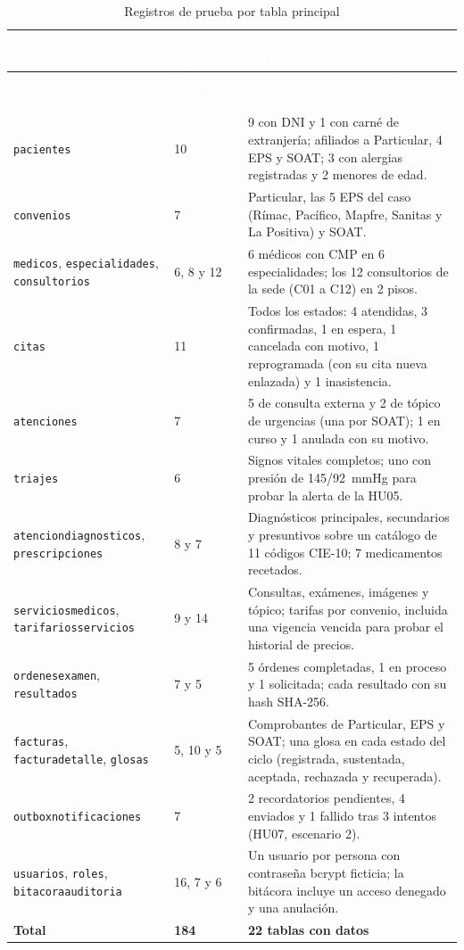 \documentclass[11pt,a4paper]{article}
\newcommand{\cab}[1]{\textcolor{white}{\textbf{#1}}}
\newcommand{\tb}[1]{{\renewcommand{\_}{\textunderscore\allowbreak}\texttt{#1}}}
\begin{document}
\begin{xltabular}{\linewidth}{|P{4.5cm}|P{2.6cm}|L|}
  \caption{Registros de prueba por tabla principal}\label{tab:datos-prueba}\\
  \hline
  \cab{Tabla principal} & \cab{N.° de registros} & \cab{Descripción de los datos ficticios} \\ \hline
  \endfirsthead
  \hline
  \cab{Tabla principal} & \cab{N.° de registros} & \cab{Descripción de los datos ficticios} \\ \hline
  \endhead
  \tb{pacientes} & 10 &
    9 con DNI y 1 con carné de extranjería; afiliados a Particular, 4 EPS y SOAT; 3 con alergias
    registradas y 2 menores de edad. \\ \hline
  \tb{convenios} & 7 &
    Particular, las 5 EPS del caso (Rímac, Pacífico, Mapfre, Sanitas y La Positiva) y SOAT. \\ \hline
  \tb{medicos}, \tb{especialidades}, \tb{consultorios} & 6, 8 y 12 &
    6 médicos con CMP en 6 especialidades; los 12 consultorios de la sede (C01 a C12) en 2 pisos. \\ \hline
  \tb{citas} & 11 &
    Todos los estados: 4 atendidas, 3 confirmadas, 1 en espera, 1 cancelada con motivo,
    1 reprogramada (con su cita nueva enlazada) y 1 inasistencia. \\ \hline
  \tb{atenciones} & 7 &
    5 de consulta externa y 2 de tópico de urgencias (una por SOAT); 1 en curso y 1 anulada
    con su motivo. \\ \hline
  \tb{triajes} & 6 &
    Signos vitales completos; uno con presión de 145/92~mmHg para probar la alerta de la HU05. \\ \hline
  \tb{atencion\_diagnosticos}, \tb{prescripciones} & 8 y 7 &
    Diagnósticos principales, secundarios y presuntivos sobre un catálogo de 11 códigos CIE-10;
    7 medicamentos recetados. \\ \hline
  \tb{servicios\_medicos}, \tb{tarifarios\_servicios} & 9 y 14 &
    Consultas, exámenes, imágenes y tópico; tarifas por convenio, incluida una vigencia
    vencida para probar el historial de precios. \\ \hline
  \tb{ordenes\_examen}, \tb{resultados} & 7 y 5 &
    5 órdenes completadas, 1 en proceso y 1 solicitada; cada resultado con su hash SHA-256. \\ \hline
  \tb{facturas}, \tb{factura\_detalle}, \tb{glosas} & 5, 10 y 5 &
    Comprobantes de Particular, EPS y SOAT; una glosa en cada estado del ciclo (registrada,
    sustentada, aceptada, rechazada y recuperada). \\ \hline
  \tb{outbox\_notificaciones} & 7 &
    2 recordatorios pendientes, 4 enviados y 1 fallido tras 3 intentos (HU07, escenario 2). \\ \hline
  \tb{usuarios}, \tb{roles}, \tb{bitacora\_auditoria} & 16, 7 y 6 &
    Un usuario por persona con contraseña bcrypt ficticia; la bitácora incluye un acceso
    denegado y una anulación. \\ \hline
  \textbf{Total} & \textbf{184} & \textbf{22 tablas con datos} \\ \hline
\end{xltabular}
\end{document}
